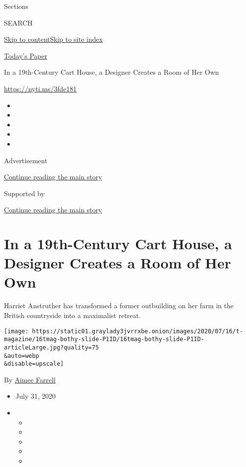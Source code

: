 Sections

SEARCH

\protect\hyperlink{site-content}{Skip to
content}\protect\hyperlink{site-index}{Skip to site index}

\href{https://myaccount.nytimes3xbfgragh.onion/auth/login?response_type=cookie\&client_id=vi}{}

\href{https://www.nytimes3xbfgragh.onion/section/todayspaper}{Today's
Paper}

In a 19th-Century Cart House, a Designer Creates a Room of Her Own

\url{https://nyti.ms/3fde181}

\begin{itemize}
\item
\item
\item
\item
\item
\end{itemize}

Advertisement

\protect\hyperlink{after-top}{Continue reading the main story}

Supported by

\protect\hyperlink{after-sponsor}{Continue reading the main story}

\hypertarget{in-a-19th-century-cart-house-a-designer-creates-a-room-of-her-own}{%
\section{In a 19th-Century Cart House, a Designer Creates a Room of Her
Own}\label{in-a-19th-century-cart-house-a-designer-creates-a-room-of-her-own}}

Harriet Anstruther has transformed a former outbuilding on her farm in
the British countryside into a maximalist retreat.

\texttt{[image: https://static01.graylady3jvrrxbe.onion/images/2020/07/16/t-magazine/16tmag-bothy-slide-P1ID/16tmag-bothy-slide-P1ID-articleLarge.jpg?quality=75\\\&auto=webp\\\&disable=upscale]}

By \href{https://www.nytimes3xbfgragh.onion/by/aimee-farrell}{Aimee
Farrell}

\begin{itemize}
\item
  July 31, 2020
\item
  \begin{itemize}
  \item
  \item
  \item
  \item
  \item
  \end{itemize}
\end{itemize}

